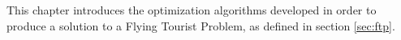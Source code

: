 This chapter introduces the optimization algorithms developed in order to produce a solution to a Flying Tourist Problem, as defined in section \ref{sec:ftp}. 


